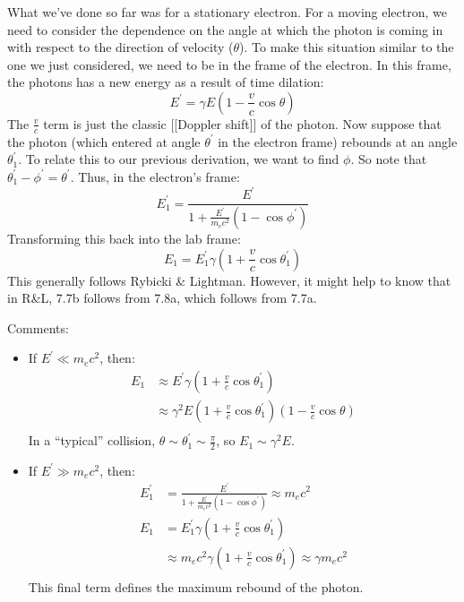 \documentclass{article}
\begin{document}
What we've done so far was for a stationary electron.  For a moving electron,
we need to consider the dependence on the angle at which the photon
is coming in with respect to the direction of velocity ($\theta$).  To make
this situation similar to the one we just considered, we need to be in the
frame of the electron.  In this frame, the photons has a new energy as a
result of time dilation:
$$E^\prime=\gamma E(1-\frac{v}{ c}\cos\theta)$$
The $\frac{v}{ c}$ term is just the classic [[Doppler shift]] of the photon.  Now
suppose that the photon (which entered at angle $\theta^\prime$ in the 
electron frame) rebounds at an angle $\theta_1^\prime$.  To relate this to
our previous derivation, we want to find $\phi$.  So note that 
$\theta_1^\prime-\phi^\prime=\theta^\prime$.  Thus, in the electron's frame:
$$E_1^\prime=\frac{E^\prime}{1+\frac{E^\prime}{ m_ec^2}(1-\cos\phi^\prime)}$$
Transforming this back into the lab frame:
$$E_1=E_1^\prime\gamma(1+\frac{v}{ c}\cos\theta_1^\prime)$$
This generally follows Rybicki \& Lightman.  However, it might help to know
that in R\&L, 7.7b follows from 7.8a, which follows from 7.7a.\par
Comments:
\begin{itemize}
\item  If $E^\prime\ll m_ec^2$, then:
$$\begin{aligned}E_1&\approx E^\prime\gamma(1+\frac{v}{ c}\cos\theta_1^\prime)\\ 
&\approx\gamma^2E(1+\frac{v}{ c}\cos\theta_1^\prime)(1-\frac{v}{ c}\cos\theta)\\ \end{aligned}$$
In a ``typical'' collision, $\theta\sim\theta_1^\prime\sim\frac{\pi}{2}$, so
$E_1\sim\gamma^2E$.
\item  If $E^\prime\gg m_ec^2$, then:
$$\begin{aligned}E_1^\prime&=\frac{E^\prime}{1+\frac{E^\prime}{ m_ec^2}
(1-\cos\phi^\prime)}\approx m_ec^2\\ 
E_1&=E_1^\prime\gamma(1+\frac{v}{ c}\cos\theta_1^\prime)\\ 
&\approx m_ec^2\gamma(1+\frac{v}{ c}\cos\theta_1^\prime)\approx\gamma m_ec^2\\ \end{aligned}$$
This final term defines the maximum rebound of the photon.
\end{itemize}

\newpage
\end{document}
